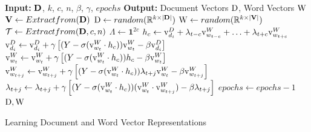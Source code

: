 \begin{algorithm}[h!]
\begin{algorithmic}[1]
 \State \textbf{Input: } $\mathbf{D}$, $k$, $c$, $n$, $\beta$, $\gamma$, $epochs$
 \State \textbf{Output: } Document Vectors $\mathrm{D}$, Word Vectors $\mathrm{W}$ 
 \State $\mathbf{V} \gets Extractfrom(\mathbf{D})$ 
 \State $\mathrm{D} \gets random(\mathbb{R}^{k \times |\mathbf{D}|})$
 \State $\mathrm{W} \gets random(\mathbb{R}^{k \times |\mathbf{V}|})$
 \State $\mathcal{T} \gets Extract from (\mathbf{D}, c, n)$ 
 \State $\Lambda \gets \mathbf{1}^{2c}$ 
  \State $h_{c} \gets \mathrm{v}^{D}_{d_{i}} + \lambda_{t-c}\mathrm{v}^{W}_{w_{t-c}} + \ldots + \lambda_{t+c}\mathrm{v}^{W}_{w_{t+c}}$
  \State $\mathrm{v}^{D}_{d_{i}} \gets \mathrm{v}^{D}_{d_{i}} + \gamma \left[ (Y - \sigma(\mathrm{v}^{W}_{w_{t}} \cdot h_{c}))\mathrm{v}^{W}_{w_{t}} - \beta\mathrm{v}^{D}_{d_{i}} \right]$
  \State $\mathrm{v}^{W}_{w_{t}} \gets \mathrm{v}^{W}_{w_{t}} + \gamma \left[ (Y - \sigma(\mathrm{v}^{W}_{w_{t}} \cdot h_{c})) h_{c} - \beta\mathrm{v}^{W}_{w_{t}} \right]$
	\State $\mathrm{v}^{W}_{w_{t+j}} \gets \mathrm{v}^{W}_{w_{t+j}} + \gamma \left[(Y - \sigma(\mathrm{v}^{W}_{w_{t}} \cdot h_{c}))\lambda_{t+j} \mathrm{v}^{W}_{w_{t}} - \beta\mathrm{v}^{W}_{w_{t+j}} \right]$
  	\State $\lambda_{t+j} \gets \lambda_{t+j} + \gamma \left[ (Y - \sigma(\mathrm{v}^{W}_{w_{t}} \cdot h_{c}))(\mathrm{v}^{W}_{w_{t}} \cdot \mathrm{v}^{W}_{w_{t+j}}) -\beta\lambda_{t+j} \right]$
  \EndFor	
  \State $epochs \gets epochs - 1$
 \EndFor 
 \EndWhile
 \\
 \Return $\mathrm{D}, \mathrm{W}$
\end{algorithmic}
\caption{Learning Document and Word Vector Representations}
\label{alg:doc_embeddings}
\end{algorithm}

